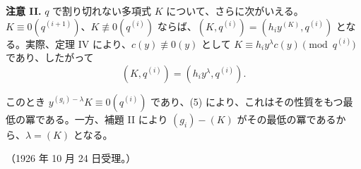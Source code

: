 \textbf{注意 II.} \(q\) で割り切れない多項式 \(K\) について、さらに次がいえる。\(K\equiv0(q^{(i+1)})\)、\(K\not\equiv0(q^{(i)})\) ならば、\((K,q^{(i)})=(h_iy^{(K)},q^{(i)})\) となる。実際、定理 IV により、\(c(y)\not\equiv0(y)\) として \(K\equiv h_iy^\lambda c(y)\pmod {q^{(i)}}\) であり、したがって
\[
(K,q^{(i)})=(h_iy^\lambda,q^{(i)}).
\]

このとき \(y^{(g_i)-\lambda}K\equiv0(q^{(i)})\) であり、(5) により、これはその性質をもつ最低の冪である。一方、補題 II により \((g_i)-(K)\) がその最低の冪であるから、\(\lambda=(K)\) となる。

\begin{center}
（1926 年 10 月 24 日受理。）
\end{center}
